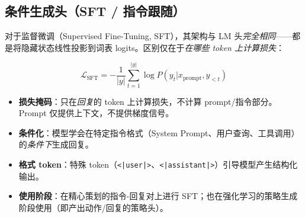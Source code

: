 \subsection{条件生成头（SFT / 指令跟随）}
\label{conditional-generation-head-sft-instruction-following}

对于监督微调（Supervised Fine-Tuning, SFT），其架构与 LM 头\emph{完全相同}——都是将隐藏状态线性投影到词表 logits。区别仅在于\emph{在哪些 token 上计算损失}：

\begin{equation}
\mathcal{L}_{\text{SFT}} = -\frac{1}{|y|}\sum_{t=1}^{|y|} \log P(y_t | x_{\text{prompt}}, y_{<t})
\end{equation}

\begin{keybox}
\begin{itemize}
  \item \textbf{损失掩码}：只在\emph{回复}的 token 上计算损失，不计算 prompt/指令部分。Prompt 仅提供上下文，不提供梯度信号。
  \item \textbf{条件化}：模型学会在特定指令格式（System Prompt、用户查询、工具调用）的\emph{条件下}生成回复。
  \item \textbf{格式 token}：特殊 token（\texttt{<|user|>}、\texttt{<|assistant|>}）引导模型产生结构化输出。
  \item \textbf{使用阶段}：在精心策划的指令-回复对上进行 SFT；也在强化学习的策略生成阶段使用（即产出动作/回复的策略头）。
\end{itemize}
\end{keybox}


